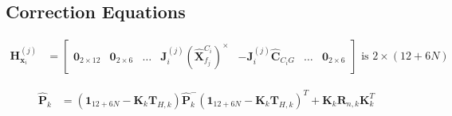 \documentclass[10pt,letterpaper,fleqn,oneside]{article}
\def\Vec#1{\mathbf{#1}} %
\newcommand{\bbm}{\begin{bmatrix}}
\newcommand{\ebm}{\end{bmatrix}}
\begin{document}
\subsection{Correction Equations}
\begin{align}
\Vec{H}^{(j)}_{\Vec{x}_i} &= \bbm \Vec{0}_{2\times12} & \Vec{0}_{2\times6} & \hdots & \Vec{J}^{\left(j\right)}_i \left(\hat{\Vec{X}}^{C_i}_{f_j}\right)^\times & -\Vec{J}^{\left(j\right)}_i \hat{\Vec{C}}_{C_i G} & \hdots & \Vec{0}_{2\times6} \ebm \text{ is } 2\times\left(12 + 6N\right)
\end{align}

\begin{align}
\hat{\Vec{P}}_k &= \left(\Vec{1}_{12+6N} - \Vec{K}_k\Vec{T}_{H,k} \right)\hat{\Vec{P}}^-_k\left(\Vec{1}_{12+6N} - \Vec{K}_k\Vec{T}_{H,k} \right)^T + \Vec{K}_k\Vec{R}_{n,k}\Vec{K}_k^T
\end{align}


%
%

\end{document}
